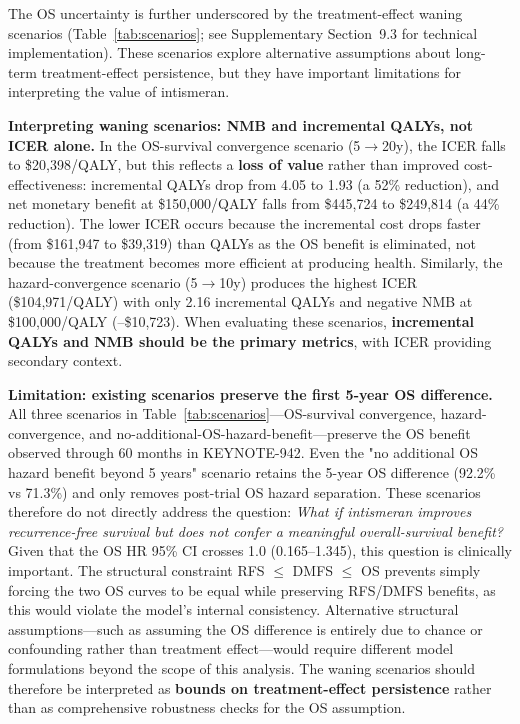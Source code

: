 \documentclass[12pt,a4paper]{article}
\begin{document}
The OS uncertainty is further underscored by the treatment-effect waning scenarios (Table~\ref{tab:scenarios}; see Supplementary Section~9.3 for technical implementation). These scenarios explore alternative assumptions about long-term treatment-effect persistence, but they have important limitations for interpreting the value of intismeran.

\textbf{Interpreting waning scenarios: NMB and incremental QALYs, not ICER alone.} In the OS-survival convergence scenario (5$\to$20y), the ICER falls to \$20,398/QALY, but this reflects a \textbf{loss of value} rather than improved cost-effectiveness: incremental QALYs drop from 4.05 to 1.93 (a 52\% reduction), and net monetary benefit at \$150,000/QALY falls from \$445,724 to \$249,814 (a 44\% reduction). The lower ICER occurs because the incremental cost drops faster (from \$161,947 to \$39,319) than QALYs as the OS benefit is eliminated, not because the treatment becomes more efficient at producing health. Similarly, the hazard-convergence scenario (5$\to$10y) produces the highest ICER (\$104,971/QALY) with only 2.16 incremental QALYs and negative NMB at \$100,000/QALY (--\$10,723). When evaluating these scenarios, \textbf{incremental QALYs and NMB should be the primary metrics}, with ICER providing secondary context.

\textbf{Limitation: existing scenarios preserve the first 5-year OS difference.} All three scenarios in Table~\ref{tab:scenarios}---OS-survival convergence, hazard-convergence, and no-additional-OS-hazard-benefit---preserve the OS benefit observed through 60 months in KEYNOTE-942. Even the "no additional OS hazard benefit beyond 5 years" scenario retains the 5-year OS difference (92.2\% vs 71.3\%) and only removes post-trial OS hazard separation. These scenarios therefore do not directly address the question: \textit{What if intismeran improves recurrence-free survival but does not confer a meaningful overall-survival benefit?} Given that the OS HR 95\% CI crosses 1.0 (0.165--1.345), this question is clinically important. The structural constraint RFS $\leq$ DMFS $\leq$ OS prevents simply forcing the two OS curves to be equal while preserving RFS/DMFS benefits, as this would violate the model's internal consistency. Alternative structural assumptions---such as assuming the OS difference is entirely due to chance or confounding rather than treatment effect---would require different model formulations beyond the scope of this analysis. The waning scenarios should therefore be interpreted as \textbf{bounds on treatment-effect persistence} rather than as comprehensive robustness checks for the OS assumption.
\end{document}
